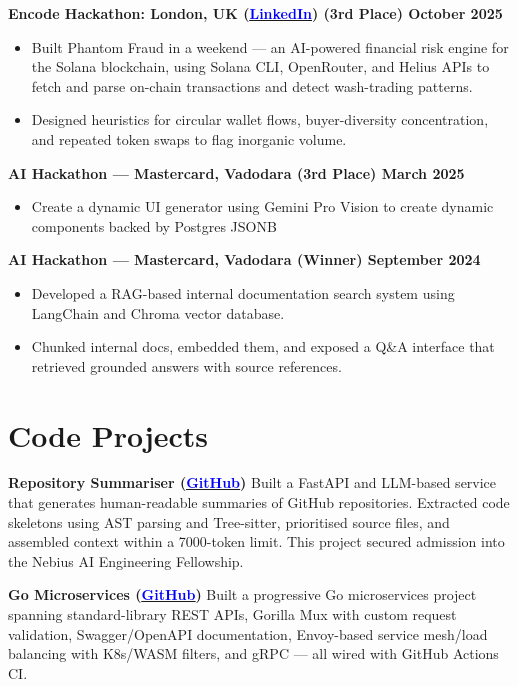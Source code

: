 \documentclass[a4paper,10pt]{article}
\let\oldhref\href
\renewcommand{\href}[2]{\oldhref{#1}{\uline{\textcolor{blue}{#2}}}}
\newcommand{\project}[1]{
  \textbf{\color{accent}#1}
}
\begin{document}
\vspace{4pt}
\project{Encode Hackathon: London, UK \small{(\href{https://www.linkedin.com/posts/aymanapatel_ml-hackathon-ai-ugcPost-7389296000080883712-MiN2/}{LinkedIn})} \hfill (3rd Place) October 2025}{}
\begin{itemize}
  \item Built Phantom Fraud in a weekend --- an AI-powered financial risk engine for the Solana blockchain, using Solana CLI, OpenRouter, and Helius APIs to fetch and parse on-chain transactions and detect wash-trading patterns.
  \item Designed heuristics for circular wallet flows, buyer-diversity concentration, and repeated token swaps to flag inorganic volume.
\end{itemize}

\vspace{4pt}
\project{AI Hackathon --- Mastercard, Vadodara \hfill (3rd Place) March 2025}{}
\begin{itemize}
    \item Create a dynamic UI generator using Gemini Pro Vision to create dynamic components backed by Postgres JSONB
\end{itemize}

\vspace{4pt}
\project{AI Hackathon --- Mastercard, Vadodara \hfill (Winner) September 2024}{}
\begin{itemize}
  \item Developed a RAG-based internal documentation search system using LangChain and Chroma vector database.
  \item Chunked internal docs, embedded them, and exposed a Q\&A interface that retrieved grounded answers with source references.
\end{itemize}

\section{Code Projects}

\project{Repository Summariser \small{(\href{https://github.com/aymanapatel/nebius-project}{GitHub})}}{Built a FastAPI and LLM-based service that generates human-readable summaries of GitHub repositories. Extracted code skeletons using AST parsing and Tree-sitter, prioritised source files, and assembled context within a 7000-token limit. This project secured admission into the Nebius AI Engineering Fellowship.}

\vspace{2pt}
\project{Go Microservices \small{(\href{https://github.com/aymanapatel/golang-microservices}{GitHub})}}{Built a progressive Go microservices project spanning standard-library REST APIs, Gorilla Mux with custom request validation, Swagger/OpenAPI documentation, Envoy-based service mesh/load balancing with K8s/WASM filters, and gRPC --- all wired with GitHub Actions CI.}
\end{document}
